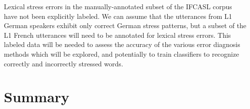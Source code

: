 Lexical stress errors in the manually-annotated subset of the IFCASL corpus have not been explicitly labeled. We can assume that the utterances from L1 German speakers exhibit only correct German stress patterns, but a subset of the L1 French utterances will need to be annotated for lexical stress errors. This labeled data will be needed to assess the accuracy of the various error diagnosis methods which will be explored, and potentially to train classifiers to recognize correctly and incorrectly stressed words. 

%

\section{Summary}
\label{sec:diag:summary}